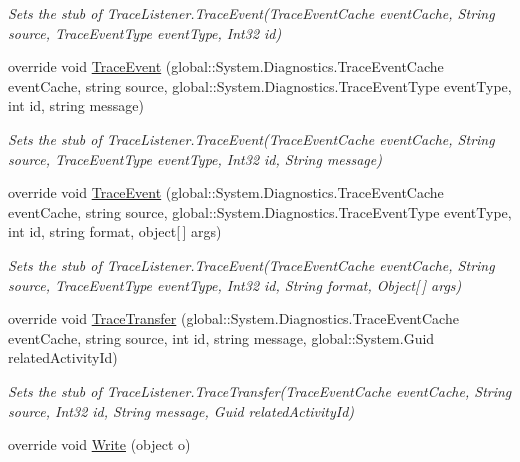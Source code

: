\begin{DoxyCompactItemize}
\begin{DoxyCompactList}\small\item\em Sets the stub of Trace\-Listener.\-Trace\-Event(\-Trace\-Event\-Cache event\-Cache, String source, Trace\-Event\-Type event\-Type, Int32 id)\end{DoxyCompactList}\item 
override void \hyperlink{class_system_1_1_diagnostics_1_1_fakes_1_1_stub_console_trace_listener_a60efa3f7c66b85ea53b9fe101cf7249e}{Trace\-Event} (global\-::\-System.\-Diagnostics.\-Trace\-Event\-Cache event\-Cache, string source, global\-::\-System.\-Diagnostics.\-Trace\-Event\-Type event\-Type, int id, string message)
\begin{DoxyCompactList}\small\item\em Sets the stub of Trace\-Listener.\-Trace\-Event(\-Trace\-Event\-Cache event\-Cache, String source, Trace\-Event\-Type event\-Type, Int32 id, String message)\end{DoxyCompactList}\item 
override void \hyperlink{class_system_1_1_diagnostics_1_1_fakes_1_1_stub_console_trace_listener_ab3ca79cd0386eabce3de8bc7ef8e698b}{Trace\-Event} (global\-::\-System.\-Diagnostics.\-Trace\-Event\-Cache event\-Cache, string source, global\-::\-System.\-Diagnostics.\-Trace\-Event\-Type event\-Type, int id, string format, object\mbox{[}$\,$\mbox{]} args)
\begin{DoxyCompactList}\small\item\em Sets the stub of Trace\-Listener.\-Trace\-Event(\-Trace\-Event\-Cache event\-Cache, String source, Trace\-Event\-Type event\-Type, Int32 id, String format, Object\mbox{[}$\,$\mbox{]} args)\end{DoxyCompactList}\item 
override void \hyperlink{class_system_1_1_diagnostics_1_1_fakes_1_1_stub_console_trace_listener_a3ed88e054a70570a052ae4ab7149a9ef}{Trace\-Transfer} (global\-::\-System.\-Diagnostics.\-Trace\-Event\-Cache event\-Cache, string source, int id, string message, global\-::\-System.\-Guid related\-Activity\-Id)
\begin{DoxyCompactList}\small\item\em Sets the stub of Trace\-Listener.\-Trace\-Transfer(\-Trace\-Event\-Cache event\-Cache, String source, Int32 id, String message, Guid related\-Activity\-Id)\end{DoxyCompactList}\item 
override void \hyperlink{class_system_1_1_diagnostics_1_1_fakes_1_1_stub_console_trace_listener_aa2a0a0a64842fb84ea676d0906a6a060}{Write} (object o)

\end{DoxyCompactItemize}
